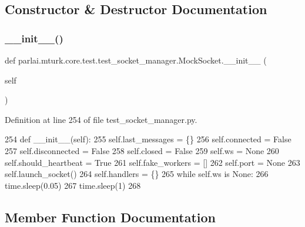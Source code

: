 \subsection{Constructor \& Destructor Documentation}
\mbox{\label{classparlai_1_1mturk_1_1core_1_1test_1_1test__socket__manager_1_1MockSocket_acddeda4f4770f8e85882192453fc899c}} 
\subsubsection{\texorpdfstring{\+\_\+\+\_\+init\+\_\+\+\_\+()}{\_\_init\_\_()}}
{\footnotesize\ttfamily def parlai.\+mturk.\+core.\+test.\+test\+\_\+socket\+\_\+manager.\+Mock\+Socket.\+\_\+\+\_\+init\+\_\+\+\_\+ (\begin{DoxyParamCaption}\item[{}]{self }\end{DoxyParamCaption})}



Definition at line 254 of file test\+\_\+socket\+\_\+manager.\+py.


\begin{DoxyCode}
254     \textcolor{keyword}{def }\_\_init\_\_(self):
255         self.last\_messages = \{\}
256         self.connected = \textcolor{keyword}{False}
257         self.disconnected = \textcolor{keyword}{False}
258         self.closed = \textcolor{keyword}{False}
259         self.ws = \textcolor{keywordtype}{None}
260         self.should\_heartbeat = \textcolor{keyword}{True}
261         self.fake\_workers = []
262         self.port = \textcolor{keywordtype}{None}
263         self.launch\_socket()
264         self.handlers = \{\}
265         \textcolor{keywordflow}{while} self.ws \textcolor{keywordflow}{is} \textcolor{keywordtype}{None}:
266             time.sleep(0.05)
267         time.sleep(1)
268 
\end{DoxyCode}


\subsection{Member Function Documentation}
\mbox{\label{classparlai_1_1mturk_1_1core_1_1test_1_1test__socket__manager_1_1MockSocket_ad93a46530112b62452a88ea08072777f}} 
